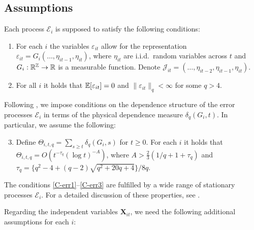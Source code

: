 \documentclass[a4paper,12pt]{article}
\begin{document}
\subsection{Assumptions}\label{subsec-model-assumptions}

Each process $\mathcal{E}_i$ is supposed to satisfy the following conditions: 

\begin{enumerate}[label=(C\arabic*),leftmargin=1.05cm]

\item \label{C-err1} For each $i$ the variables $\varepsilon_{it}$ allow for the representation $\varepsilon_{it} = G_i(\ldots,\eta_{it-1},\eta_{it})$, where $\eta_{it}$ are i.i.d.\ random variables across $t$ and $G_i: \mathbb{R}^{\mathbb{Z}} \rightarrow \mathbb{R}$ is a measurable function. Denote $\mathcal{J}_{it} = (\ldots,\eta_{it-2},\eta_{it-1},\eta_{it})$.

\item \label{C-err2} For all $i$ it holds that $\mathbb{E}[\varepsilon_{it}] =0$ and $\| \varepsilon_{it} \|_q < \infty$ for some $q > 4$. 

\end{enumerate}

Following \cite{Wu2005}, we impose conditions on the dependence structure of the error processes $\mathcal{E}_i$ in terms of the physical dependence measure $\delta_q(G_i, t)$. In particular, we assume the following: 
\begin{enumerate}[label=(C\arabic*),leftmargin=1.05cm]
\setcounter{enumi}{2}

\item \label{C-err3} Define $\Theta_{i, t,q} = \sum\nolimits_{s \ge t} \delta_q(G_i, s)$ for $t \ge 0$. For each $i$ it holds that 
$\Theta_{i, t,q} = O ( t^{-\tau_q} (\log t)^{-A} )$,  
where $A > \frac{2}{3} (1/q + 1 + \tau_q)$ and $\tau_q = \{q^2 - 4 + (q-2) \sqrt{q^2 + 20q + 4}\} / 8q$. 

\end{enumerate}

The conditions \ref{C-err1}--\ref{C-err3} are fulfilled by a wide range of stationary processes $\mathcal{E}_i$. For a detailed discussion of these properties, see \cite{KhismatullinaVogt2018}.

Regarding the independent variables $ \mathbf{X}_{it}$, we need the following additional assumptions for each $i$:
\end{document}
